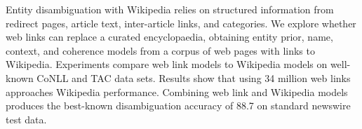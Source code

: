 Entity disambiguation with Wikipedia relies on structured information from redirect pages, article text, inter-article links, and categories. We explore whether web links can replace a curated encyclopaedia, obtaining entity prior, name, context, and coherence models from a corpus of web pages with links to Wikipedia. Experiments compare web link models to Wikipedia models on well-known CoNLL and TAC data sets. Results show that using 34 million web links approaches Wikipedia performance. Combining web link and Wikipedia models produces the best-known disambiguation accuracy of 88.7 on standard newswire test data.